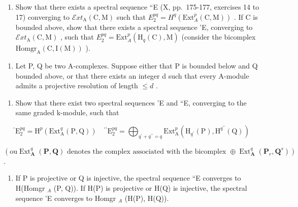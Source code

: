 \begin{enumerate}
\def\labelenumi{\alph{enumi})}
\setcounter{enumi}{2}
\tightlist
\item
  Show that there exists a spectral sequence ``E (X, pp.~175-177, exercises 14 to 17) converging to \(\mathcal{E}xt_{\mathrm{A}}(\mathrm{C},\mathrm{M})\) such that \(E_2^{pq} = H^q (\mathrm{Ext}_A^p (\mathrm{C},\mathrm{M}))\) . If C is bounded above, show that there exists a spectral sequence 'E, converging to \(\mathcal{E}xt_{\mathrm{A}}(\mathrm{C},\mathrm{M})\) , such that \(E_2^{pq} = \mathrm{Ext}_A^p (\mathrm{H}_q(\mathrm{C}),\mathrm{M})\) (consider the bicomplex \(\mathrm{Homgr}_{\mathrm{A}}(\mathrm{C},\mathrm{I}(\mathrm{M}))\) ).
\end{enumerate}

\begin{enumerate}
\def\labelenumi{\arabic{enumi})}
\setcounter{enumi}{7}
\tightlist
\item
  Let P, Q be two A-complexes. Suppose either that P is bounded below and Q bounded above, or that there exists an integer d such that every A-module admits a projective resolution of length \(\leqslant d\) .
\end{enumerate}

\begin{enumerate}
\def\labelenumi{\alph{enumi})}
\tightlist
\item
  Show that there exist two spectral sequences 'E and ``E, converging to the same graded k-module, such that
\end{enumerate}

\[
^ {\prime} \mathrm{E} _ {2} ^ {p q} = \mathrm{H} ^ {p} (\mathrm{Ext} _ {\mathrm{A}} ^ {q} (\mathrm{P}, \mathrm{Q})) \quad^ {\prime \prime} \mathrm{E} _ {2} ^ {p q} = \bigoplus_ {q ^ {\prime} + q ^ {\prime \prime} = q} \mathrm{Ext} _ {\mathrm{A}} ^ {p} (\mathrm{H} _ {q ^ {\prime}} (\mathrm{P}), \mathrm{H} ^ {q ^ {\prime \prime}} (\mathrm{Q}))
\]

\((\text{ou} \operatorname{Ext}_{\mathbf{A}}^{q}(\mathbf{P}, \mathbf{Q}) \text{ denotes the complex associated with the bicomplex } \oplus \operatorname{Ext}_{\mathbf{A}}^{q}(\mathbf{P}_{r}, \mathbf{Q}^{s}))\) .

\begin{enumerate}
\def\labelenumi{\alph{enumi})}
\setcounter{enumi}{1}
\tightlist
\item
  If P is projective or Q is injective, the spectral sequence ``E converges to H(Homgr \(_A\) (P, Q)). If H(P) is projective or H(Q) is injective, the spectral sequence 'E converges to Homgr \(_A\) (H(P), H(Q)).
\end{enumerate}

